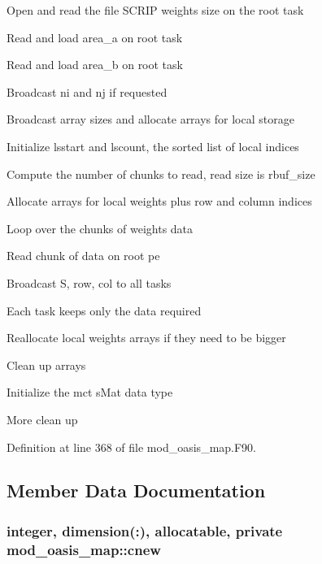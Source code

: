\begin{DoxyItemize}
\item Open and read the file S\+C\+R\+I\+P weights size on the root task
\item Read and load area\+\_\+a on root task
\item Read and load area\+\_\+b on root task
\item Broadcast ni and nj if requested
\item Broadcast array sizes and allocate arrays for local storage
\item Initialize lsstart and lscount, the sorted list of local indices
\item Compute the number of chunks to read, read size is rbuf\+\_\+size
\item Allocate arrays for local weights plus row and column indices
\item Loop over the chunks of weights data
\begin{DoxyItemize}
\item Read chunk of data on root pe
\item Broadcast S, row, col to all tasks
\item Each task keeps only the data required
\item Reallocate local weights arrays if they need to be bigger
\end{DoxyItemize}
\item Clean up arrays
\item Initialize the mct s\+Mat data type
\item More clean up 
\end{DoxyItemize}

Definition at line 368 of file mod\+\_\+oasis\+\_\+map.\+F90.



\subsection{Member Data Documentation}
\hypertarget{classmod__oasis__map_a8ae737bd62499fe60ebb48d04ad3b6dd}{
\subsubsection[{cnew}]{\setlength{\rightskip}{0pt plus 5cm}integer, dimension(\+:), allocatable, private mod\+\_\+oasis\+\_\+map\+::cnew\hspace{0.3cm}{\ttfamily [private]}}}\label{classmod__oasis__map_a8ae737bd62499fe60ebb48d04ad3b6dd}


